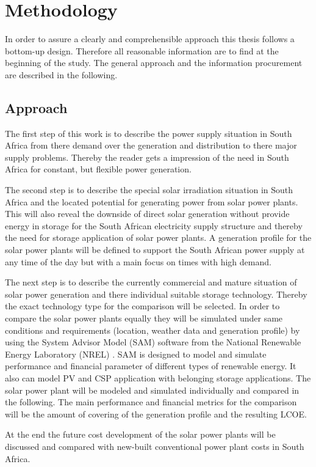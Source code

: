 \chapter{Methodology}
In order to assure a clearly and comprehensible approach this thesis follows a bottom-up design. Therefore all reasonable information are to find at the beginning of the study. The general approach and the information procurement are described in the following.
\section{Approach}
The first step of this work is to describe the power supply situation in South Africa from there demand over the generation and distribution to there major supply problems. Thereby the reader gets a impression of the need in South Africa for constant, but flexible power generation.

The second step is to describe the special solar irradiation situation in South Africa and the located potential for generating power from solar power plants. This will also reveal the downside of  direct solar generation without provide energy in storage for the South African electricity supply structure and thereby the need for storage application of solar power plants. A generation profile for the solar power plants will be defined to support the South African power supply at any time of the day but with a main focus on times with high demand. 

The next step is to describe the currently commercial and mature situation of solar power generation and there individual suitable storage technology. Thereby the exact technology type for the comparison will be selected. In order to compare the solar power plants equally they will be simulated under same conditions and requirements (location, weather data and generation profile) by using the System Advisor Model (SAM) software from the National Renewable Energy Laboratory (NREL) \cite{NREL2015}. SAM is designed to model and simulate performance and financial parameter of different types of renewable energy. It also can model PV and CSP application with belonging storage applications. The solar power plant will be modeled and simulated individually and compared in the following. The main performance and financial metrics for the comparison will be the amount of covering of the generation profile and the resulting LCOE.

At the end the future cost development of the solar power plants will be discussed and compared with new-built conventional power plant costs in South Africa.
